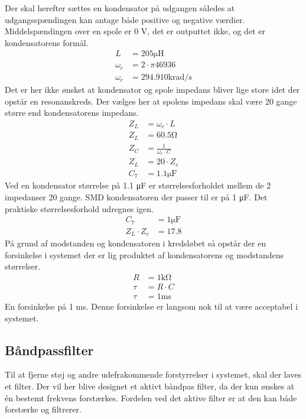Der skal herefter sættes en kondensator på udgangen således at udgangsspændingen kan antage både positive og negative værdier. 
Middelspændingen over en spole er 0 \si{\volt}, det er outputtet ikke, og det er kondensatorens formål. 
\begin{align}
	L & = 205 \si{\micro \henry} \nonumber  \\
	\omega_c & = 2 \cdot \pi 46936 \\
	\omega_c & = 294.910 \si{\kilo\radian\per\second} \nonumber 
	\end{align}
Det er her ikke ønsket at kondensator og spole impedans bliver lige store idet der opstår en resonanskreds. 
Der vælges her at spolens impedans skal være 20 gange større end kondensatorens impedans.
\begin{align}
	Z_L & = \omega_c \cdot L \\
	Z_L & = 60.5 \si{\ohm} \nonumber \\
	Z_C & = \frac{1}{\omega_c \cdot C} \\
	Z_L & = 20 \cdot Z_c \\
	C_7 & = 1.1 \si{\micro\farad} \nonumber
	\end{align}
Ved en kondensator størrelse på 1.1 \si{\micro\farad} er størrelsesforholdet mellem de 2 impedanser 20 gange. 
SMD kondensatoren der passer til er på 1 \si{\micro\farad}. Det praktiske størrelsesforhold udregnes igen.
\begin{align}
	C_7 & = 1 \si{\micro\farad} \nonumber \\
	Z_L \cdot Z_c & = 17.8 \nonumber
	\end{align}
På grund af modstanden og kondensatoren i kredsløbet så opstår der en forsinkelse i systemet der er lig produktet af kondensatorens og modstandens størrelser. 
\begin{align}
	R & = 1 \si{\kilo\ohm} \nonumber \\
	\tau & = R \cdot C \\
	\tau & = 1 \si{\milli\second} \nonumber
\end{align}
En forsinkelse på 1 \si{\milli\second}. 
Denne forsinkelse er langsom nok til at være acceptabel i systemet. 
\subsection{Båndpassfilter}
Til at fjerne støj og andre udefrakommende forstyrrelser i systemet, skal der laves et filter.
Der vil her blive designet et aktivt båndpas filter, da der kun ønskes at én bestemt frekvens forstærkes.
Fordelen ved det aktive filter er at den kan både forstærke og filtrerer.

